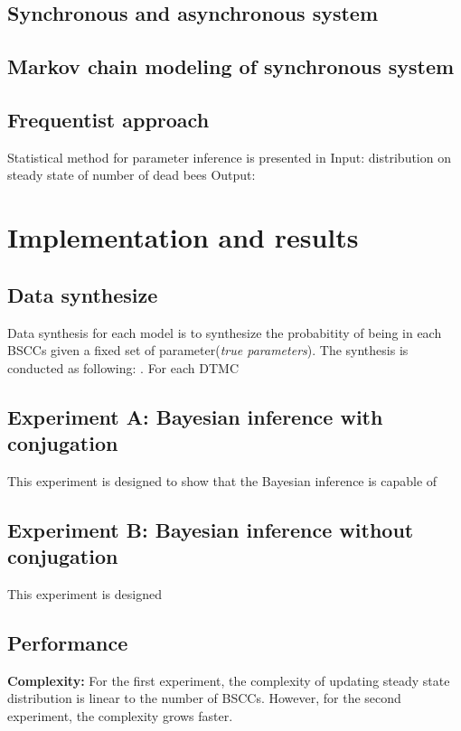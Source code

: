 \documentclass[12pt]{article}
\begin{document}
\subsection{Synchronous and asynchronous system}


\subsection{Markov chain modeling of synchronous system}

\subsection{Frequentist approach}
Statistical method for parameter inference is presented in \cite{hajnal2019data}
Input: distribution on steady state of number of dead bees Output:

\section{Implementation and results}
\subsection{Data synthesize}
Data synthesis for each model is to synthesize the probabitity of being in each
BSCCs given a fixed set of parameter(\textit{true parameters}). The synthesis is
conducted as following:
. For each DTMC


\subsection{Experiment A: Bayesian inference with conjugation}
This experiment is designed to show that the Bayesian inference is capable of 

\subsection{Experiment B: Bayesian inference without conjugation}
This experiment is designed

\subsection{Performance}
\textbf{Complexity: } For the first experiment, the complexity of updating steady state distribution
is linear to the number of BSCCs. However, for the second experiment, the
complexity grows faster.\\
\end{document}
